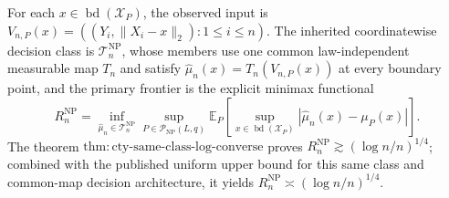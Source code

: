 For each \(x\in\operatorname{bd}(\mathcal X_P)\), the observed input is \(V_{n,P}(x)=((Y_i,\lVert X_i-x\rVert_2):1\leq i\leq n)\).  The inherited coordinatewise decision class is \(\mathcal T_n^{\mathrm{NP}}\), whose members use one common law-independent measurable map \(T_n\) and satisfy \(\widehat\mu_n(x)=T_n(V_{n,P}(x))\) at every boundary point, and the primary frontier is the explicit minimax functional
\[
 R_n^{\mathrm{NP}}
 =\inf_{\widehat\mu_n\in\mathcal T_n^{\mathrm{NP}}}
 \sup_{P\in\mathcal P_{\mathrm{NP}}(L,q)}
 \mathbb E_P\!\left[
 \sup_{x\in\operatorname{bd}(\mathcal X_P)}
 |\widehat\mu_n(x)-\mu_P(x)|
 \right].
\]
The theorem \(\mathrm{thm:cty\text{-}same\text{-}class\text{-}log\text{-}converse}\) proves \(R_n^{\mathrm{NP}}\gtrsim(\log n/n)^{1/4}\); combined with the published uniform upper bound for this same class and common-map decision architecture, it yields \(R_n^{\mathrm{NP}}\asymp(\log n/n)^{1/4}\).